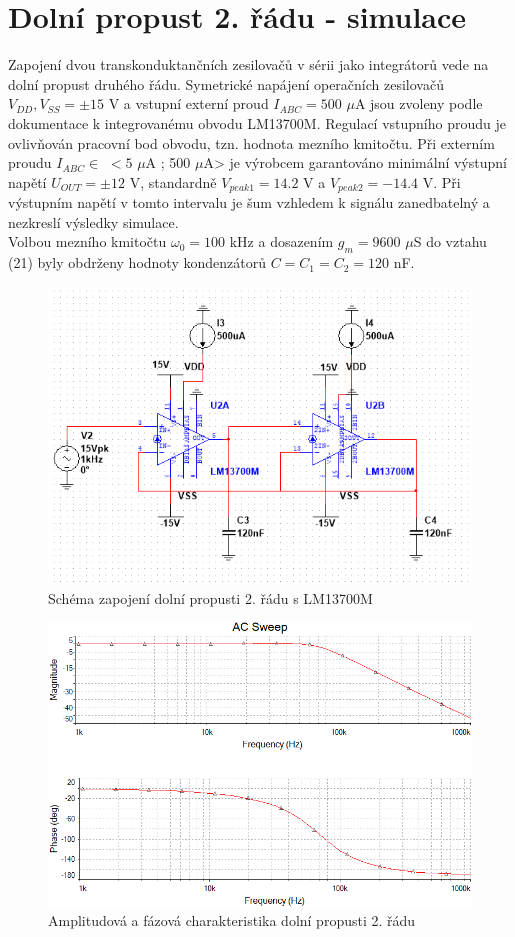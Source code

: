 \documentclass[twoside]{article}
\begin{document}
\section{Dolní propust 2. řádu - simulace}
Zapojení dvou transkonduktančních zesilovačů v sérii jako integrátorů vede na dolní propust druhého řádu. Symetrické napájení operačních zesilovačů $V_{DD},V_{SS} = \pm 15$ V a vstupní externí proud $I_{ABC} = 500$ $\mu$A jsou zvoleny podle dokumentace k integrovanému obvodu LM13700M. Regulací vstupního proudu je ovlivňován pracovní bod obvodu, tzn. hodnota mezního kmitočtu. Při externím proudu $I_{ABC} \in$ $<5$ $\mu$A ; 500 $\mu$A> je výrobcem garantováno minimální výstupní napětí $U_{OUT} = \pm 12$ V, standardně $V_{peak 1} = 14.2$ V a $V_{peak 2} = -14.4$ V. Při výstupním napětí v tomto intervalu je šum vzhledem k signálu zanedbatelný a nezkreslí výsledky simulace.\\
Volbou mezního kmitočtu $\omega _0 = 100$ kHz a dosazením $g_m = 9600$ $\mu$S do vztahu (21) byly obdrženy hodnoty kondenzátorů $C = C_1 = C_2 = 120$ nF.
\begin{figure}[H]
\centering
\includegraphics[scale=0.75]{lowpasszapojeni.png}
\caption{Schéma zapojení dolní propusti 2. řádu s LM13700M}
\end{figure}
\begin{figure}[H]
\centering
\includegraphics[scale=0.75]{lowpass2.png}
\caption{Amplitudová a fázová charakteristika dolní propusti 2. řádu}
\end{figure}
\end{document}
